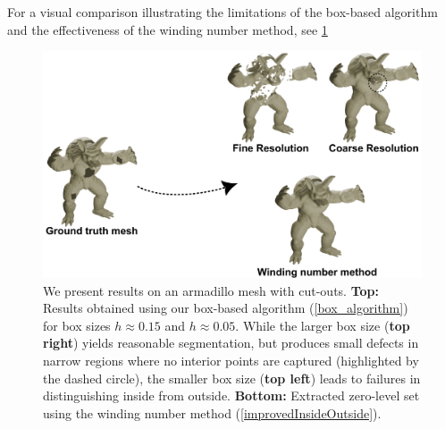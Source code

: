 \documentclass[draft,12pt,openany]{book}
\theoremstyle{plainnormal}
\theoremstyle{remark}
\begin{document}
    For a visual comparison illustrating the limitations of the box-based algorithm and the effectiveness of the winding number method, see \cref{Winding_fig}
\begin{figure}[!t]
    \centering
    \includegraphics[width=\linewidth]{Figures/WindingNumberFig.pdf}
    \caption{We present results on an armadillo mesh with cut-outs. \textbf{Top:} Results obtained using our box-based algorithm (\cref{box_algorithm}) for box sizes $h \approx 0.15$ and $h \approx 0.05$. While the larger box size (\textbf{top right}) yields reasonable segmentation, but produces small defects in narrow regions where no interior points are captured (highlighted by the dashed circle), the smaller box size (\textbf{top left}) leads to failures in distinguishing inside from outside. \textbf{Bottom:} Extracted zero-level set using the winding number method (\cref{improvedInsideOutside}).
}
    \label{Winding_fig}
\end{figure}
\end{document}
